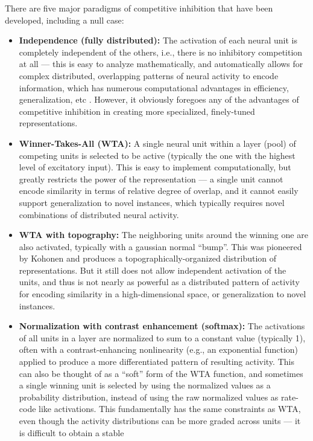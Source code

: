 \documentclass[11pt,twoside]{article}
\begin{document}
There are five major paradigms of competitive inhibition that have
been developed, including a null case:
\begin{itemize}
\item {\bf Independence (fully distributed):} The activation of each
  neural unit is completely independent of the others, i.e., there is
  no inhibitory competition at all --- this is easy to analyze
  mathematically, and automatically allows for complex distributed,
  overlapping patterns of neural activity to encode information, which
  has numerous computational advantages in efficiency, generalization,
  etc \cite{Rumelhart}.  However, it obviously foregoes any of the
  advantages of competitive inhibition in creating more specialized,
  finely-tuned representations.
\item {\bf Winner-Takes-All (WTA):} A single neural unit within a
  layer (pool) of competing units is selected to be active (typically
  the one with the highest level of excitatory input).  This is easy
  to implement computationally, but greatly restricts the power of the
  representation --- a single unit cannot encode similarity in terms
  of relative degree of overlap, and it cannot easily support
  generalization to novel instances, which typically requires novel
  combinations of distributed neural activity.
\item {\bf WTA with topography:} The neighboring units around the
  winning one are also activated, typically with a gaussian normal
  ``bump''.  This was pioneered by Kohonen and produces a
  topographically-organized distribution of representations.  But it
  still does not allow independent activation of the units, and thus
  is not nearly as powerful as a distributed pattern of activity for
  encoding similarity in a high-dimensional space, or generalization
  to novel instances.
\item {\bf Normalization with contrast enhancement (softmax):} The
  activations of all units in a layer are normalized to sum to a
  constant value (typically 1), often with a contrast-enhancing
  nonlinearity (e.g., an exponential function) applied to produce a
  more differentiated pattern of resulting activity.  This can also be
  thought of as a ``soft'' form of the WTA function, and sometimes a
  single winning unit is selected by using the normalized values as a
  probability distribution, instead of using the raw normalized values
  as rate-code like activations.  This fundamentally has the same
  constraints as WTA, even though the activity distributions can be
  more graded across units --- it is difficult to obtain a stable

\end{itemize}
\end{document}
